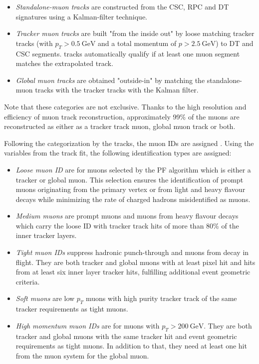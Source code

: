 \begin{itemize}
	\item[] \textit{Standalone-muon tracks} are constructed from the CSC, RPC and DT signatures using a Kalman-filter technique.
	\item[] \textit{Tracker muon tracks} are built "from the inside out" by loose matching tracker tracks (with $p_T > \SI{0.5}{\giga\electronvolt}$ and a total momentum of $p>\SI{2.5}{\giga\electronvolt}$) to DT and CSC segments. tracks automatically qualify if at least one muon segment matches the extrapolated track.
	\item[] \textit{Global muon tracks} are obtained "outside-in" by matching the standalone-muon tracks with the tracker tracks with the Kalman filter.
\end{itemize}

Note that these categories are not exclusive. Thanks to the high resolution and efficiency of muon track reconstruction, approximately 99\% of the muons are reconstructed as either as a tracker track muon, global muon track or both.

Following the categorization by the tracks, the muon IDs are assigned \cite{Sirunyan_2018_muons}. Using the variables from the track fit, the following identification types are assigned:

\begin{itemize}
	\item[] \textit{Loose muon ID} are for muons selected by the PF algorithm which is either a tracker or global muon. This selection ensures the identification of prompt muons originating from the primary vertex or from light and heavy flavour decays while minimizing the rate of charged hadrons misidentified as muons.
	\item[] \textit{Medium muons} are prompt muons and muons from heavy flavour decays which carry the loose ID with tracker track hits of more than 80\% of the inner tracker layers.
	\item[] \textit{Tight muon IDs} suppress hadronic punch-through and muons from decay in flight. They are both tracker and global muons with at least pixel hit and hits from at least six inner layer tracker hits, fulfilling additional event geometric criteria.
	\item[] \textit{Soft muons} are low $p_T$ muons with high purity tracker track of the same tracker requirements as tight muons.
	\item[] \textit{High momentum muon IDs} are for muons with $p_T > \SI{200}{\giga\electronvolt}$. They are both tracker and global muons with the same tracker hit and event geometric requirements as tight muons. In addition to that, they need at least one hit from the muon system for the global muon.
\end{itemize}